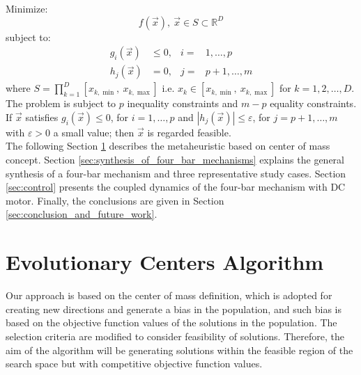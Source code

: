 \documentclass[12pt,letterpape]{article}
\begin{document}
\noindent
Minimize:
\begin{equation}
	f(\vec{x}),\ \vec{x}  \in S \subset \mathbb{R}^D
	\label{eqn:fx}
\end{equation}
%
subject to:
\begin{align*}
	g_i(\vec{x}) &\leq 0,& i =&  1 , \ldots, p \\
	h_j(\vec{x}) &= 0,& j =& p+1, \ldots, m
\end{align*}
%
where $S = \prod_{k = 1}^D  [ x_{k,\min},\ x_{k,\max} ]$ i.e. $x_k \in [ x_{k,\min},\ x_{k,\max} ]$ 
for $k = 1,2,\ldots,D$. The problem is subject to $p$ inequality constraints and 
$m - p$ equality constraints. If $\vec{x}$ satisfies $g_i( \vec{x} ) \leq 0$, for 
$i = 1, \ldots, p$ and $|h_j(\vec{x})| \leq \varepsilon$, for $j = p+1, \ldots, m$ 
with $\varepsilon > 0$ a small value; then $\vec{x}$ is regarded feasible.\\


The following Section \ref{sec:eca} describes the metaheuristic based on center of mass concept. Section \ref{sec:synthesis_of_four_bar_mechanisms} explains the general synthesis of a four-bar mechanism and three representative study cases. Section \ref{sec:control} presents the coupled dynamics of the four-bar mechanism with DC motor.
Finally, the conclusions are given in Section \ref{sec:conclusion_and_future_work}.

% 
\section{Evolutionary Centers Algorithm} %
\label{sec:eca}

Our approach is based on the center of mass definition, which is adopted for 
creating new directions and generate a bias in the population, and such bias is 
based on the objective function values of the solutions in the population. The 
selection criteria are modified to consider feasibility of solutions. Therefore, 
the aim of the algorithm will be generating solutions within the feasible region 
of the search space but with competitive objective function values.

%
%
\end{document}
